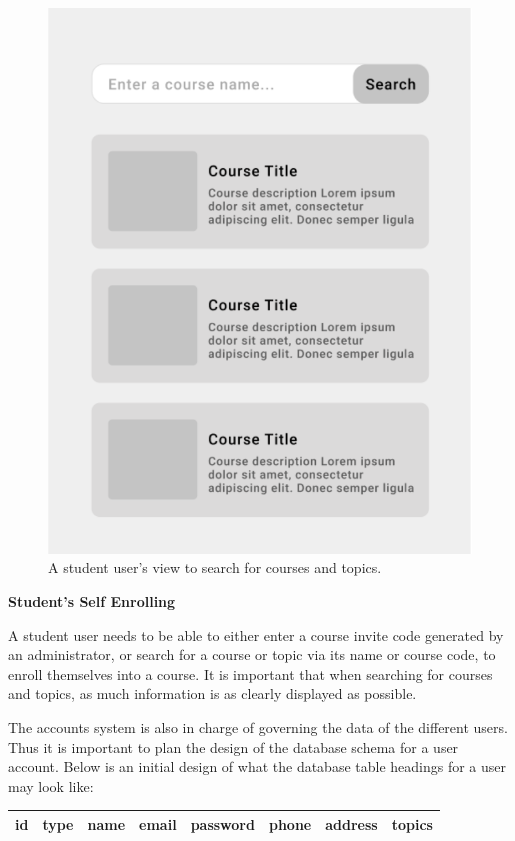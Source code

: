 \begin{figure}[h!]
  \centering
  \includegraphics[scale=0.2]{images/accounts-search}
  \caption{A student user's view to search for courses and topics.}
\end{figure}

\textbf{Student's Self Enrolling}

A student user needs to be able to either enter a course invite code generated by an administrator, or search for a course or topic via its name or course code, to enroll themselves into a course. It is important that when searching for courses and topics, as much information is as clearly displayed as possible.

The accounts system is also in charge of governing the data of the different users. Thus it is important to plan the design of the database schema for a user account. Below is an initial design of what the database table headings for a user may look like:

\begin{center}
    \begin{tabular}{|c|c|c|c|c|c|c|c|} 
        \hline
        id & type & name & email & password & phone & address & topics \\ [0.5ex] 
        \hline
    \end{tabular}
\end{center}

